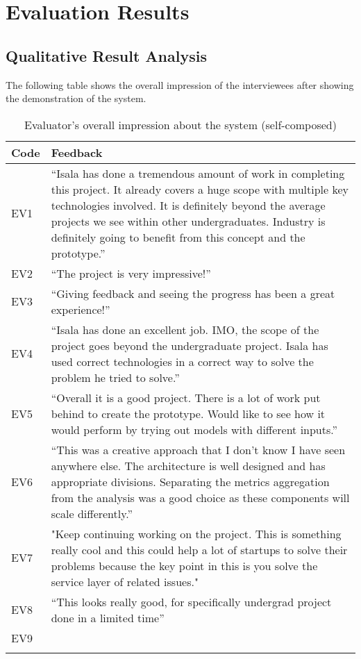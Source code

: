 \section{Evaluation Results}

\subsection{Qualitative Result Analysis}

The following table shows the overall impression of the interviewees after showing the demonstration of the system.


\begin{longtable}{|p{8mm}|p{147mm}|}
    \hline
    \textbf{Code} & \textbf{Feedback} \\ \hline
    EV1 & “Isala has done a tremendous amount of work in completing this project. It already covers a huge scope with multiple key technologies involved. It is definitely beyond the average projects we see within other undergraduates. Industry is definitely going to benefit from this concept and the prototype.” \\ \hline
    EV2 & “The project is very impressive!” \\ \hline
    EV3 & “Giving feedback and seeing the progress has been a great experience!” \\ \hline
    EV4 & “Isala has done an excellent job. IMO, the scope of the project goes beyond the undergraduate project. Isala has used correct technologies in a correct way to solve the problem he tried to solve.” \\ \hline
    EV5 & “Overall it is a good project. There is a lot of work put behind to create the prototype. Would like to see how it would perform by trying out models with different inputs.” \\ \hline
    EV6 & “This was a creative approach that I don’t know I have seen anywhere else. The architecture is well designed and has appropriate divisions. Separating the metrics aggregation from the analysis was a good choice as these components will scale differently.” \\ \hline
    EV7 & "Keep continuing working on the project. This is something really cool and this could help a lot of startups to solve their problems because the key point in this is you solve the service layer of related issues." \\ \hline
    EV8 & “This looks really good, for specifically undergrad project done in a limited time” \\ \hline
    EV9 &  \\ \hline
    \caption{Evaluator's overall impression about the system (self-composed)}
\end{longtable}

